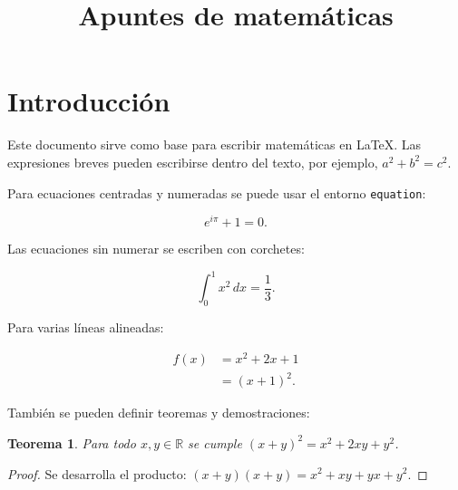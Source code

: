 \documentclass[12pt,a4paper]{article}
\title{Apuntes de matemáticas}
\author{}
\date{}
\begin{document}
\maketitle

\section{Introducción}

Este documento sirve como base para escribir matemáticas en \LaTeX. Las
expresiones breves pueden escribirse dentro del texto, por ejemplo,
$a^2+b^2=c^2$.

Para ecuaciones centradas y numeradas se puede usar el entorno
\texttt{equation}:

\begin{equation}
	e^{i\pi}+1=0.
\end{equation}

Las ecuaciones sin numerar se escriben con corchetes:

\[
	\int_0^1 x^2\,dx = \frac{1}{3}.
\]

Para varias líneas alineadas:

\begin{align}
	f(x) &= x^2 + 2x + 1 \\
		 &= (x+1)^2.
\end{align}

También se pueden definir teoremas y demostraciones:

\newtheorem{teorema}{Teorema}

\begin{teorema}
	Para todo $x,y\in\mathbb{R}$ se cumple $(x+y)^2=x^2+2xy+y^2$.
\end{teorema}

\begin{proof}
	Se desarrolla el producto: $(x+y)(x+y)=x^2+xy+yx+y^2$.
\end{proof}
\end{document}
